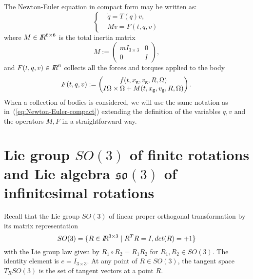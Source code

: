 %
The Newton-Euler equation in compact form may be written as:
\begin{equation}
\label{eq:Newton-Euler-compact}
\boxed{ \left \{ 
 \begin{aligned}
  &\dot q=T(q)v, \\
  & M \dot v = F(t, q, v)
 \end{aligned}
 \right.}
\end{equation}
where $M\in\mbox{\rm $I\!\!R$}^{6\times6}$ is the total inertia matrix
\begin{equation}
  M:= \begin{pmatrix}
    m I_{3\times 3} & 0 \\
    0 & I 
  \end{pmatrix},
\end{equation}
and $F(t, q, v)\in \mbox{\rm $I\!\!R$}^6$ collects all the forces and torques applied to the body
\begin{equation}
  F(t,q,v):= \begin{pmatrix}
    f(t,x_{\sf \small g},  v_{\sf \small g}, R, \Omega ) \\
    I \Omega \times \Omega + M(t,x_{\sf \small g}, v_{\sf \small g}, R, \Omega )
  \end{pmatrix}.
\end{equation}
When a collection of bodies is considered, we will use the same notation as in~(\ref{eq:Newton-Euler-compact}) extending the definition of the variables $q,v$ and the operators $M,F$ in a straightforward way.





\section{ Lie group $SO(3)$ of finite rotations and Lie algebra $\mathfrak{so}(3)$ of infinitesimal rotations}

Recall that the Lie group $SO(3)$ of linear proper orthogonal transformation by its matrix representation
\begin{equation}
  \label{eq:47}
  SO(3) = \{R \in \mbox{\rm $I\!\!R$}^{3\times3}\mid R^TR=I , det(R) = +1  \}
\end{equation}
with the Lie group law given by $R_1\circ R_2 = R_1R_2$ for $R_1,R_2\in SO(3)$. The identity element is $e = I_{3\times 3}$. At any point of $R\in SO(3)$, the tangent space $T_RSO(3)$ is the set of tangent vectors at a point $R$.

